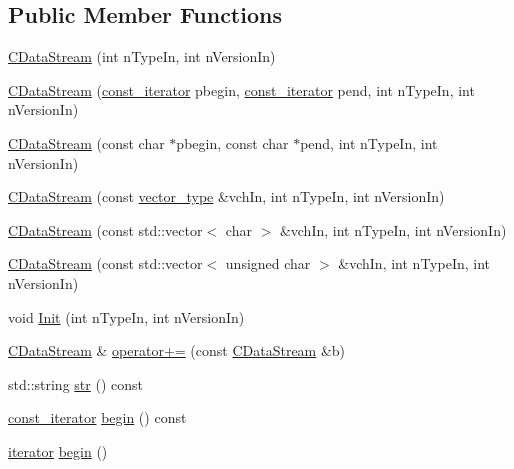 \subsection*{Public Member Functions}
\begin{DoxyCompactItemize}
\item 
\hyperlink{class_c_data_stream_a38f4d7d2ae59566a0500523a1b1a49d4}{C\+Data\+Stream} (int n\+Type\+In, int n\+Version\+In)
\item 
\hyperlink{class_c_data_stream_a00d23d0ef651cb4ea54cb37009bdf8f2}{C\+Data\+Stream} (\hyperlink{class_c_data_stream_abcfd79b72607505b22f18424e313b4c5}{const\+\_\+iterator} pbegin, \hyperlink{class_c_data_stream_abcfd79b72607505b22f18424e313b4c5}{const\+\_\+iterator} pend, int n\+Type\+In, int n\+Version\+In)
\item 
\hyperlink{class_c_data_stream_ab345d2edd7bef6c6c140a46621e49eee}{C\+Data\+Stream} (const char $\ast$pbegin, const char $\ast$pend, int n\+Type\+In, int n\+Version\+In)
\item 
\hyperlink{class_c_data_stream_a38a51fefce23374963516b3af03638fc}{C\+Data\+Stream} (const \hyperlink{class_c_data_stream_a5e86187632a0d6cea39f3ea525427e27}{vector\+\_\+type} \&vch\+In, int n\+Type\+In, int n\+Version\+In)
\item 
\hyperlink{class_c_data_stream_a46219676397ae7b3cbc0c676f74ba1e7}{C\+Data\+Stream} (const std\+::vector$<$ char $>$ \&vch\+In, int n\+Type\+In, int n\+Version\+In)
\item 
\hyperlink{class_c_data_stream_ac63bd3d0ecce0edc2aa66cc80b633b6f}{C\+Data\+Stream} (const std\+::vector$<$ unsigned char $>$ \&vch\+In, int n\+Type\+In, int n\+Version\+In)
\item 
void \hyperlink{class_c_data_stream_a95267358054cbfbf37e239f3e6c78471}{Init} (int n\+Type\+In, int n\+Version\+In)
\item 
\hyperlink{class_c_data_stream}{C\+Data\+Stream} \& \hyperlink{class_c_data_stream_a59c13d9215c13b3bb4d56a818d280dda}{operator+=} (const \hyperlink{class_c_data_stream}{C\+Data\+Stream} \&b)
\item 
std\+::string \hyperlink{class_c_data_stream_aa3a9ecf166f36f4ea531d2b23628d2c9}{str} () const 
\item 
\hyperlink{class_c_data_stream_abcfd79b72607505b22f18424e313b4c5}{const\+\_\+iterator} \hyperlink{class_c_data_stream_a5b9e70188c662f4e9496066472af213e}{begin} () const 
\item 
\hyperlink{class_c_data_stream_abed2013224bdf424e51c78bf483886d3}{iterator} \hyperlink{class_c_data_stream_a4b8ed86db3a4563fc327c903b0ccf4ee}{begin} ()

\end{DoxyCompactItemize}
